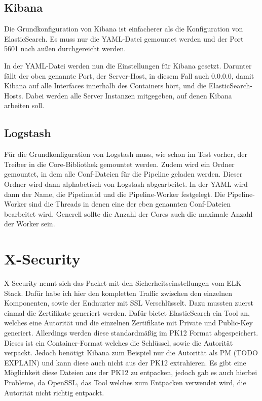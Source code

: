 \subsection{Kibana}

Die Grundkonfiguration von Kibana ist einfacherer als die Konfiguration von ElasticSearch. Es muss nur die YAML-Datei gemountet werden und der Port 5601 nach außen durchgereicht werden.

In der YAML-Datei werden nun die Einstellungen für Kibana gesetzt. Darunter fällt der oben genannte Port, der Server-Host, in diesem Fall auch 0.0.0.0, damit Kibana auf alle Interfaces innerhalb des Containers hört, und die ElasticSearch-Hosts. Dabei werden alle Server Instanzen mitgegeben, auf denen Kibana arbeiten soll. 

\subsection{Logstash}

Für die Grundkonfiguration von Logstash muss, wie schon im Test vorher, der Treiber in die Core-Bibliothek gemountet werden. Zudem wird ein Ordner gemountet, in dem alle Conf-Dateien für die Pipeline geladen werden. Dieser Ordner wird dann alphabetisch von Logstash abgearbeitet. In der YAML wird dann der Name, die Pipeline.id und die Pipeline-Worker festgelegt. Die Pipeline-Worker sind die Threads in denen eine der eben genannten Conf-Dateien bearbeitet wird. Generell sollte die Anzahl der Cores auch die maximale Anzahl der Worker sein.


\section{X-Security}

X-Security nennt sich das Packet mit den Sicherheitseinstellungen vom ELK-Stack. Dafür habe ich hier den kompletten Traffic zwischen den einzelnen Komponenten, sowie der Endnuzter mit SSL Verschlüsselt. Dazu mussten zuerst einmal die Zertifikate generiert werden. Dafür bietet ElasticSearch ein Tool an, welches eine Autorität und die einzelnen Zertifikate mit Private und Public-Key generiert. Allerdings werden diese standardmäßig im PK12 Format abgespeichert. Dieses ist ein Container-Format welches die Schlüssel, sowie die Autorität verpackt. Jedoch benötigt Kibana zum Beispiel nur die Autorität als PM (TODO EXPLAIN) und kann diese auch nicht aus der PK12 extrahieren.
Es gibt eine Möglichkeit diese Dateien aus der PK12 zu entpacken, jedoch gab es auch hierbei Probleme, da OpenSSL, das Tool welches zum Entpacken verwendet wird, die Autorität nicht richtig entpackt. \cite{nerophon.2018}

